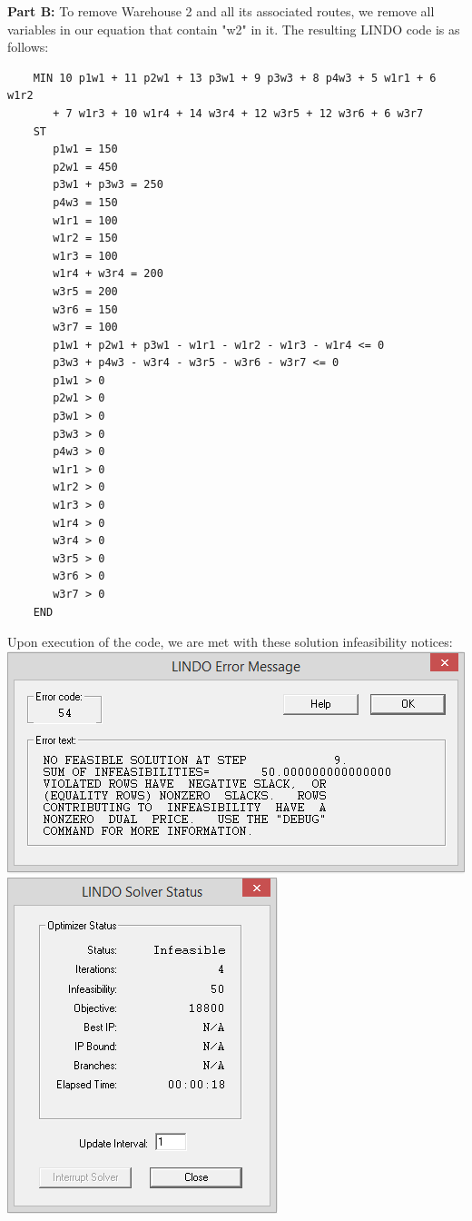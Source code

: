 \documentclass[paper=a4, fontsize=11pt]{scrartcl} %
\numberwithin{equation}{section} %
\numberwithin{figure}{section} %
\numberwithin{table}{section} %
\begin{document}
\textbf{Part B:}\newline
	To remove Warehouse 2 and all its associated routes, we remove all variables in our equation that contain "w2" in it. The resulting LINDO code is as follows:

	\begin{verbatim}
	MIN 10 p1w1 + 11 p2w1 + 13 p3w1 + 9 p3w3 + 8 p4w3 + 5 w1r1 + 6 w1r2 
	   + 7 w1r3 + 10 w1r4 + 14 w3r4 + 12 w3r5 + 12 w3r6 + 6 w3r7
	ST
	   p1w1 = 150
	   p2w1 = 450
	   p3w1 + p3w3 = 250
	   p4w3 = 150	
	   w1r1 = 100
	   w1r2 = 150
	   w1r3 = 100
	   w1r4 + w3r4 = 200	
	   w3r5 = 200
	   w3r6 = 150
	   w3r7 = 100
	   p1w1 + p2w1 + p3w1 - w1r1 - w1r2 - w1r3 - w1r4 <= 0 
	   p3w3 + p4w3 - w3r4 - w3r5 - w3r6 - w3r7 <= 0 
	   p1w1 > 0
	   p2w1 > 0
	   p3w1 > 0
	   p3w3 > 0
	   p4w3 > 0
	   w1r1 > 0
	   w1r2 > 0
	   w1r3 > 0
	   w1r4 > 0
	   w3r4 > 0
	   w3r5 > 0
	   w3r6 > 0
	   w3r7 > 0
	END
	\end{verbatim}
	
	Upon execution of the code, we are met with these solution infeasibility notices:\newline
	\includegraphics[width=\textwidth]{p1b-err}
	\includegraphics[width=\textwidth]{p1b}
	
\end{document}
